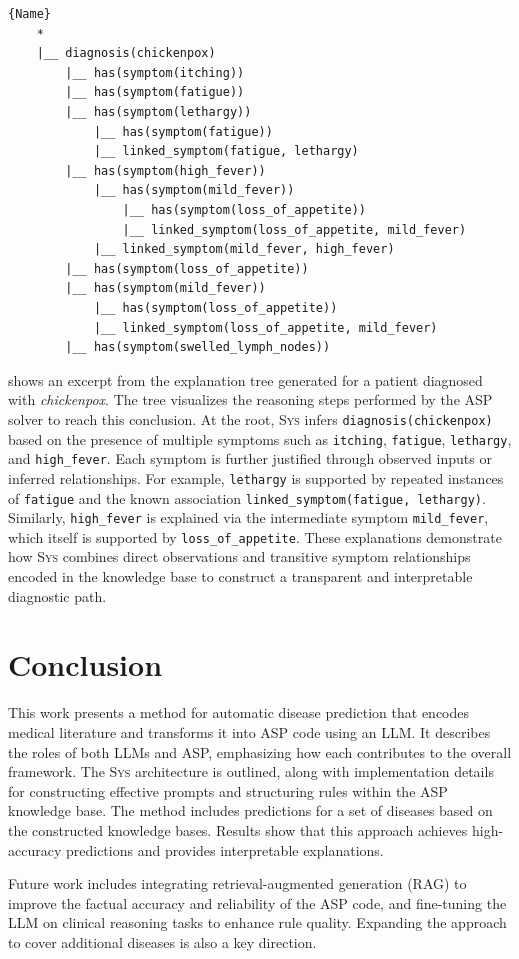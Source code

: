 \documentclass[10pt,leqno]{amsart}
\newcommand{\sys}{\textsc{Sys}\xspace}
\begin{document}
\begin{lstlisting}[caption={Excerpt from the explanation tree for the chickenpox diagnosis. The structure illustrates the reasoning path based on symptom associations (slightly modified for clarity).},
    label=lst:chickenpox_explanation]{Name}
    *
    |__ diagnosis(chickenpox)
        |__ has(symptom(itching))
        |__ has(symptom(fatigue))
        |__ has(symptom(lethargy))
            |__ has(symptom(fatigue))
            |__ linked_symptom(fatigue, lethargy)
        |__ has(symptom(high_fever))
            |__ has(symptom(mild_fever))
                |__ has(symptom(loss_of_appetite))
                |__ linked_symptom(loss_of_appetite, mild_fever)
            |__ linked_symptom(mild_fever, high_fever)
        |__ has(symptom(loss_of_appetite))
        |__ has(symptom(mild_fever))
            |__ has(symptom(loss_of_appetite))
            |__ linked_symptom(loss_of_appetite, mild_fever)
        |__ has(symptom(swelled_lymph_nodes))
\end{lstlisting}
    
 shows an excerpt from the explanation 
tree generated for a patient diagnosed with \textit{chickenpox}. 
The tree visualizes the reasoning steps performed by the ASP solver to reach this conclusion. 
At the root, \sys infers \texttt{diagnosis(chickenpox)} 
based on the presence of multiple symptoms such as \texttt{itching}, \texttt{fatigue}, \texttt{lethargy}, 
and \texttt{high\_fever}. 
Each symptom is further justified through observed inputs or inferred relationships. 
For example, \texttt{lethargy} is supported by repeated instances of \texttt{fatigue} 
and the known association \texttt{linked\_symptom(fatigue, lethargy)}. 
Similarly, \texttt{high\_fever} is explained via the intermediate symptom \texttt{mild\_fever}, 
which itself is supported by \texttt{loss\_of\_appetite}. 
These explanations demonstrate how \sys combines direct observations 
and transitive symptom relationships encoded in the knowledge base to 
construct a transparent and interpretable diagnostic path.

\section{Conclusion}

This work presents a method for automatic disease prediction 
that encodes medical literature and transforms it into ASP code using an LLM. 
It describes the roles of both LLMs and ASP, emphasizing how each contributes to the overall framework. 
The \sys architecture is outlined, along with implementation details for constructing effective prompts 
and structuring rules within the ASP knowledge base.
The method includes predictions for a set of diseases based on the constructed knowledge bases. 
Results show that this approach achieves high-accuracy predictions and provides interpretable explanations.

Future work includes integrating retrieval-augmented generation (RAG) to improve the factual accuracy 
and reliability of the ASP code, and fine-tuning the LLM on clinical reasoning tasks to enhance rule quality. 
Expanding the approach to cover additional diseases is also a key direction.
\newpage


\end{document}
